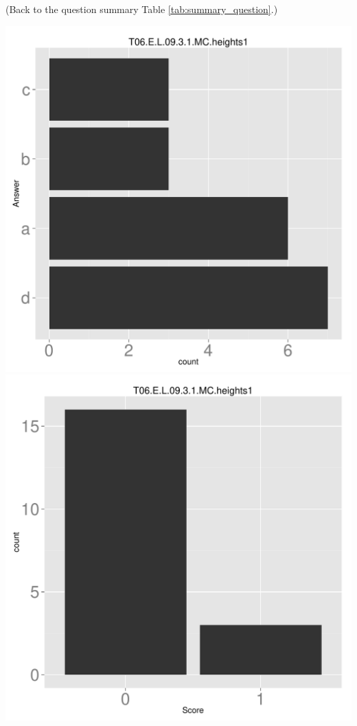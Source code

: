 \documentclass[12pt,english,nohyper]{tufte-handout}\usepackage[]{graphicx}\usepackage[]{color}
\begin{document}
 (Back to the question summary Table \ref{tab:summary_question}.)

\begin{center} \includegraphics[width=.45\linewidth]{Topic06_AB_36_answer} \includegraphics[width=.45\linewidth]{Topic06_AB_36_score} \end{center} 
\end{document}
